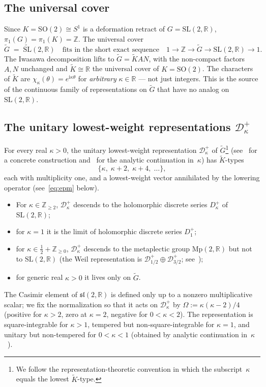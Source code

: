 \documentclass[11pt]{article}
\theoremstyle{plain}
\theoremstyle{definition}
\theoremstyle{remark}
\newcommand{\R}{\mathbb{R}}
\newcommand{\Z}{\mathbb{Z}}
\newcommand{\sltwo}{\mathfrak{sl}(2,\R)}
\newcommand{\SL}{\mathrm{SL}}
\newcommand{\SO}{\mathrm{SO}}
\newcommand{\Mp}{\mathrm{Mp}}
\newcommand{\Kt}{\widetilde{K}}
\newcommand{\Gt}{\widetilde{G}}
\newcommand{\SLt}{\widetilde{\mathrm{SL}}}
\newcommand{\D}{\mathcal{D}}
\newcommand{\ii}{\mathrm{i}}
\begin{document}
\subsection{The universal cover}

Since $K=\SO(2)\cong S^{1}$ is a deformation retract of $G=\SL(2,\R)$,
$\pi_{1}(G)=\pi_{1}(K)=\Z$. The universal cover
\[
  \Gt\;=\;\SLt(2,\R)\quad\text{fits in the short exact sequence}\quad
  1\to\Z\to\Gt\to\SL(2,\R)\to 1.
\]
The Iwasawa decomposition lifts to $\Gt=\Kt AN$, with the non-compact
factors $A,N$ unchanged and $\Kt\cong\R$ the universal cover of $K=\SO(2)$.
The characters of $\Kt$ are $\chi_{\kappa}(\theta)=e^{\ii\kappa\theta}$ for
\emph{arbitrary} $\kappa\in\R$ --- not just integers. This is the source of
the continuous family of representations on $\Gt$ that have no analog on
$\SL(2,\R)$.

\subsection{The unitary lowest-weight representations \texorpdfstring{$\D^{+}_{\kappa}$}{D+\_kappa}}
\label{ssec:disc-series}

For every real $\kappa>0$, the unitary lowest-weight representation
$\D^{+}_{\kappa}$ of $\Gt$\footnote{We follow the representation-theoretic convention in which the subscript~$\kappa$ equals the lowest $\Kt$-type.} (see~\cite[Ch.~II]{HoweTan1992}
for a concrete construction and~\cite{Sally1967} for the analytic
continuation in~$\kappa$) has $\Kt$-types
\[
  \{\kappa,\;\kappa+2,\;\kappa+4,\;\ldots\},
\]
each with multiplicity one, and a lowest-weight vector annihilated by the
lowering operator (see~\eqref{eq:epm} below).
\begin{itemize}[leftmargin=2em,topsep=2pt,itemsep=2pt]
  \item For $\kappa\in\Z_{\ge 2}$, $\D^{+}_{\kappa}$ descends to the holomorphic
        discrete series $D^{+}_{\kappa}$ of $\SL(2,\R)$;
  \item for $\kappa=1$ it is the limit of holomorphic discrete series $D^{+}_{1}$;
  \item for $\kappa\in\tfrac12+\Z_{\ge 0}$,
        $\D^{+}_{\kappa}$ descends to the metaplectic group $\Mp(2,\R)$ but not to $\SL(2,\R)$
        (the Weil representation is
        $\D^{+}_{1/2}\oplus\D^{+}_{3/2}$; see~\cite[Ch.~IV]{HoweTan1992});
  \item for generic real $\kappa>0$ it lives only on $\Gt$.
\end{itemize}
The Casimir element of $\sltwo$ is defined only up to a nonzero
multiplicative scalar; we fix the normalization so that it acts on
$\D^{+}_{\kappa}$ by $\Omega:=\kappa(\kappa-2)/4$
(positive for $\kappa>2$, zero at $\kappa=2$, negative for $0<\kappa<2$). The representation is
square-integrable for $\kappa>1$, tempered but non-square-integrable for $\kappa=1$,
and unitary but non-tempered for
$0<\kappa<1$ (obtained by analytic continuation in~$\kappa$~\cite{Sally1967}).
\end{document}

